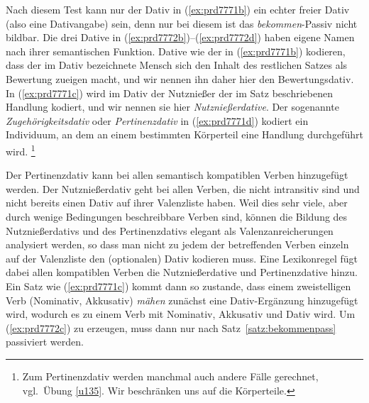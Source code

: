 \begin{exe}
  \ex\label{ex:prd7772} 
  \begin{xlist}
  \end{xlist}
\end{exe}


Nach diesem Test kann nur der Dativ in (\ref{ex:prd7771b}) ein echter freier Dativ (also eine Dativangabe) sein, denn nur bei diesem ist das \textit{bekommen}-Passiv nicht bildbar.
Die drei Dative in (\ref{ex:prd7772b})--(\ref{ex:prd7772d}) haben eigene Namen nach ihrer semantischen Funktion.
Dative wie der in (\ref{ex:prd7771b}) kodieren, dass der im Dativ bezeichnete Mensch sich den Inhalt des restlichen Satzes als Bewertung zueigen macht, und wir nennen ihn daher hier den Bewertungsdativ.
In (\ref{ex:prd7771c}) wird im Dativ der Nutznießer der im Satz beschriebenen Handlung kodiert, und wir nennen sie hier \textit{Nutznießerdative}.
Der sogenannte \textit{Zugehörigkeitsdativ} oder \textit{Pertinenzdativ} in (\ref{ex:prd7771d}) kodiert ein Individuum, an dem an einem bestimmten Körperteil eine Handlung durchgeführt wird.%
\footnote{Zum Pertinenzdativ werden manchmal auch andere Fälle gerechnet, vgl.\ Übung \ref{u135}.
Wir beschränken uns auf die Körperteile.}


Der Pertinenzdativ kann bei allen semantisch kompatiblen Verben hinzugefügt werden.
Der Nutznießerdativ geht bei allen Verben, die nicht intransitiv sind und nicht bereits einen Dativ auf ihrer Valenzliste haben.
Weil dies sehr viele, aber durch wenige Bedingungen beschreibbare Verben sind, können die Bildung des Nutznießerdativs und des Pertinenzdativs elegant als Valenzanreicherungen analysiert werden, so dass man nicht zu jedem der betreffenden Verben einzeln auf der Valenzliste den (optionalen) Dativ kodieren muss.
Eine Lexikonregel fügt dabei allen kompatiblen Verben die Nutznießerdative und Pertinenzdative hinzu.
Ein Satz wie (\ref{ex:prd7771c}) kommt dann so zustande, dass einem zweistelligen Verb (Nominativ, Akkusativ) \textit{mähen} zunächst eine Dativ-Ergänzung hinzugefügt wird, wodurch es zu einem Verb mit Nominativ,  Akkusativ und Dativ wird.
Um (\ref{ex:prd7772c}) zu erzeugen, muss dann nur nach Satz~\ref{satz:bekommenpass} passiviert werden.

